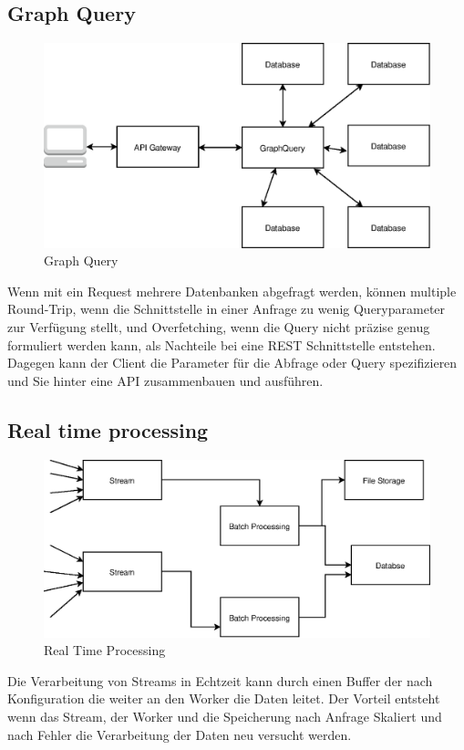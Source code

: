 \documentclass[
12pt,
english,
ngerman,
headsepline,
twoside,
openright,
numbers=noenddot,version=first
]{scrreprt}
\begin{document}
\subsection{Graph Query}
\begin{figure}
	\includegraphics[scale=0.36]{./pics/GraphQuery.eps}
	\caption{Graph Query}
	\label{pic:graph-query}
\end{figure}
Wenn mit ein Request mehrere Datenbanken abgefragt werden, können multiple Round-Trip, wenn die Schnittstelle in einer Anfrage zu wenig Queryparameter zur Verfügung stellt, und Overfetching, wenn die Query nicht präzise genug formuliert werden kann, als Nachteile bei eine \acrshort{REST} Schnittstelle entstehen. Dagegen kann der Client die Parameter für die Abfrage oder Query spezifizieren und Sie hinter eine \acrshort{API} zusammenbauen und ausführen. 


\subsection{Real time processing}
\begin{figure}
	\includegraphics[scale=0.36]{./pics/real-time-processing.eps}
	\caption{Real Time Processing}
	\label{pic:real-time-processing}
\end{figure}
Die Verarbeitung von Streams in Echtzeit kann durch einen Buffer der nach Konfiguration die weiter an den Worker die Daten leitet. Der Vorteil entsteht wenn das Stream, der Worker und die Speicherung nach Anfrage Skaliert und nach Fehler die Verarbeitung der Daten neu versucht werden. 
\end{document}
